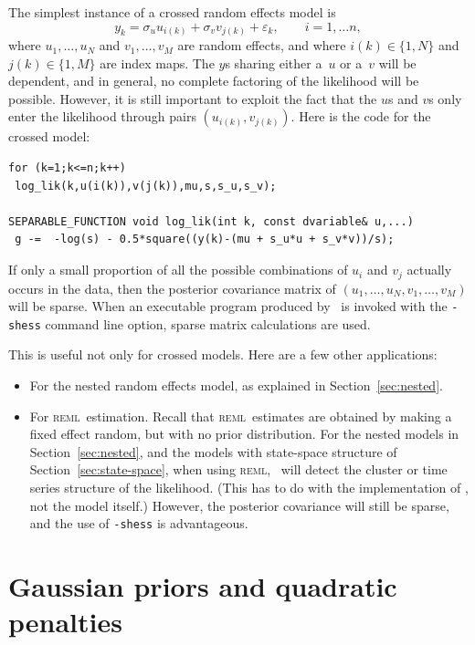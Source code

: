 \documentclass{admbmanual}
\newcommand{\scREML}{\textsc{reml}}
\begin{document}
The simplest instance of a crossed random effects model is
\[
  y_{k}= \sigma_u u_{i(k)} + \sigma_v v_{j(k)}+\varepsilon_{k},
            \qquad i=1,\ldots n,
\]
where $u_{1},\ldots,u_{N}$ and $v_{1},\ldots,v_{M}$ are random effects, and
where $i(k)\in\{1,N\}$ and $j(k)\in\{1,M\}$ are index maps. The $y$s sharing
either a~$u$ or a~$v$ will be dependent, and in general, no complete factoring
of the likelihood will be possible. However, it is still important to exploit
the fact that the $u$s and $v$s only enter the likelihood through pairs
$(u_{i(k)},v_{j(k)})$. Here is the code for the crossed model:
\begin{lstlisting}
for (k=1;k<=n;k++)
 log_lik(k,u(i(k)),v(j(k)),mu,s,s_u,s_v);

SEPARABLE_FUNCTION void log_lik(int k, const dvariable& u,...)
 g -=  -log(s) - 0.5*square((y(k)-(mu + s_u*u + s_v*v))/s);
\end{lstlisting}
If only a small proportion of all the possible combinations of $u_i$ and $v_j$
actually occurs in the data, then the posterior covariance matrix of
$(u_{1},\ldots,u_{N},v_{1},\ldots,v_{M})$ will be sparse. When an executable
program produced by \scAR\ is invoked with the \texttt{-shess} command line
option, sparse matrix calculations are used.

This is useful not only for crossed models. Here are a few other applications:
\begin{itemize}
  \item For the nested random effects model, as explained in
  Section~\ref{sec:nested}.

  \item For \scREML\ estimation. Recall that \scREML\ estimates are obtained by
  making a fixed effect random, but with no prior distribution. For the nested
  models in Section~\ref{sec:nested}, and the models with state-space structure
  of Section~\ref{sec:state-space}, when using \scREML, \scAR\ will detect the
  cluster or time series structure of the likelihood. (This has to do with the
  implementation of \scAR, not the model itself.) However, the posterior
  covariance will still be sparse, and the use of \texttt{-shess} is
  advantageous. 
\end{itemize}

\section{Gaussian priors and quadratic penalties\label{gaussianprior}}
\end{document}
